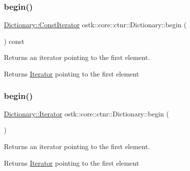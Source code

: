 \subsubsection{\texorpdfstring{begin()}{begin()}\hspace{0.1cm}{\footnotesize\ttfamily [1/2]}}
{\footnotesize\ttfamily \hyperlink{classostk_1_1core_1_1ctnr_1_1_dictionary_1_1_const_iterator}{Dictionary\+::\+Const\+Iterator} ostk\+::core\+::ctnr\+::\+Dictionary\+::begin (\begin{DoxyParamCaption}{ }\end{DoxyParamCaption}) const}



Returns an iterator pointing to the first element. 

\begin{DoxyReturn}{Returns}
\hyperlink{classostk_1_1core_1_1ctnr_1_1_dictionary_1_1_iterator}{Iterator} pointing to the first element 
\end{DoxyReturn}
\mbox{\label{classostk_1_1core_1_1ctnr_1_1_dictionary_a972e93881264ad988667bb7bde314aef}} 
\subsubsection{\texorpdfstring{begin()}{begin()}\hspace{0.1cm}{\footnotesize\ttfamily [2/2]}}
{\footnotesize\ttfamily \hyperlink{classostk_1_1core_1_1ctnr_1_1_dictionary_1_1_iterator}{Dictionary\+::\+Iterator} ostk\+::core\+::ctnr\+::\+Dictionary\+::begin (\begin{DoxyParamCaption}{ }\end{DoxyParamCaption})}



Returns an iterator pointing to the first element. 

\begin{DoxyReturn}{Returns}
\hyperlink{classostk_1_1core_1_1ctnr_1_1_dictionary_1_1_iterator}{Iterator} pointing to the first element 
\end{DoxyReturn}
\mbox{\label{classostk_1_1core_1_1ctnr_1_1_dictionary_aec25beb38e45838f3211a5932d88853b}} 
